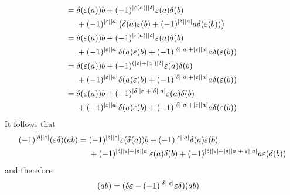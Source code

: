\begin{enumerate}
\begin{align*}
      ={}&
        \delta(\varepsilon(a)) b
      + (-1)^{\lvert\varepsilon(a)\rvert \lvert\delta\rvert}
        \varepsilon(a) \delta(b)
      \\
      {}&
      + (-1)^{\lvert\varepsilon\rvert \lvert a\rvert}
        \bigl(
            \delta(a)\varepsilon(b)
          + (-1)^{\lvert\delta\rvert \lvert a\rvert} a \delta(\varepsilon(b))
        \bigr)
      \\
      ={}&
        \delta(\varepsilon(a)) b
      + (-1)^{\lvert\varepsilon(a)\rvert \lvert\delta\rvert}
        \varepsilon(a) \delta(b)
      \\
      {}&
      + (-1)^{\lvert\varepsilon\rvert \lvert a\rvert} \delta(a)\varepsilon(b)
      + (-1)^{\lvert\delta\rvert \lvert a\rvert + \lvert\varepsilon\rvert \lvert a\rvert}
        a \delta(\varepsilon(b))
      \\
      ={}&
        \delta(\varepsilon(a)) b
      + (-1)^{(\lvert\varepsilon\rvert + \lvert a\rvert) \lvert\delta\rvert}
        \varepsilon(a) \delta(b)
      \\
      {}&
      + (-1)^{\lvert\varepsilon\rvert \lvert a\rvert}
        \delta(a)\varepsilon(b)
      + (-1)^{\lvert\delta\rvert \lvert a\rvert + \lvert\varepsilon\rvert \lvert a\rvert}
        a \delta(\varepsilon(b))
      \\
      ={}&
        \delta(\varepsilon(a)) b
      + (-1)^{\lvert\delta\rvert \lvert\varepsilon\rvert + \lvert\delta\rvert \lvert a\rvert}
        \varepsilon(a) \delta(b)
      \\
      {}&
      + (-1)^{\lvert\varepsilon\rvert \lvert a\rvert}
        \delta(a) \varepsilon(b)
      + (-1)^{\lvert\delta\rvert \lvert a\rvert + \lvert\varepsilon\rvert \lvert a\rvert}
        a \delta(\varepsilon(b))
    \end{align*}
    \endgroup
    It follows that
    \begin{align*}
      (-1)^{\lvert\delta\rvert \lvert\varepsilon\rvert}
      (\varepsilon \delta)(ab)
      ={}&
        (-1)^{\lvert\delta\rvert \lvert\varepsilon\rvert}
        \varepsilon(\delta(a)) b
      + (-1)^{\lvert\varepsilon\rvert \lvert a\rvert}
        \delta(a) \varepsilon(b)
      \\
      {}&
      + (-1)^{\lvert\delta\rvert \lvert\varepsilon\rvert + \lvert\delta\rvert \lvert a\rvert}
        \varepsilon(a) \delta(b)
      + (-1)^{\lvert\delta\rvert \lvert\varepsilon\rvert  + \lvert\delta\rvert \lvert a\rvert + \lvert\varepsilon\rvert \lvert a\rvert}
        a \varepsilon(\delta(b))
    \end{align*}
    and therefore
    \begingroup
    \allowdisplaybreaks
    \begin{align*}
      [\delta, \varepsilon](ab)
      ={}&
      (\delta \varepsilon - (-1)^{\hdeg{\delta} \hdeg{\varepsilon}} \varepsilon \delta)(ab)

\end{align*}
\end{enumerate}
